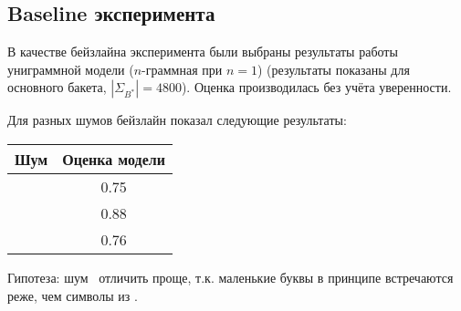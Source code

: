 \subsection{ Baseline эксперимента }

В качестве бейзлайна эксперимента были выбраны результаты работы униграммной модели ($n$-граммная при $n = 1$) (результаты показаны для основного бакета, $|\Sigma_{B^*}| = 4800$). Оценка производилась без учёта уверенности.

Для разных шумов бейзлайн показал следующие результаты:

\begin{tabular}{|c|c|} \hline
	Шум 	& Оценка модели \\ \hline
	\KG	& 0.75  \\
	\BS & 0.88  \\
	\MX & 0.76 \\ \hline
\end{tabular}

\vspace{20pt}

Гипотеза: шум \BS\ отличить проще, т.к. маленькие буквы в принципе встречаются реже, чем символы из \KG. 